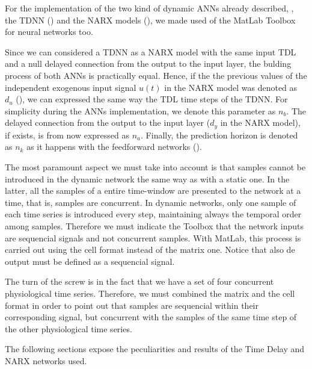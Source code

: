 
\label{sec:application:tdnn}

For the implementation of the two kind of dynamic ANNs already described, 
\ie, the TDNN () and the NARX models (), 
we made used of the MatLab Toolbox for neural networks too. 

Since we can considered a TDNN as a NARX model with the same input TDL 
and a null delayed connection from the output to the input layer, 
the bulding process of both ANNs is practically equal. Hence, if the the previous values of the independent exogenous input signal $u(t)$ in the NARX model was denoted as $d_{u}$ (), we can expressed the same way the TDL time steps of the TDNN. For simplicity during the ANNs implementation, we denote this parameter as $n_{b}$. The delayed connection from the output to the input layer ($d_{y}$ in the NARX model), if exists, is from now expressed as $n_{a}$. 
Finally, the prediction horizon is denoted as $n_{k}$ as it happens with the feedforward networks ().

The most paramount aspect we must take into account is that samples cannot be introduced in the dynamic network the same way as with a static one. 
In the latter, all the samples of a entire time-window are presented to the network at a time, that is, samples are concurrent. 
In dynamic networks, only one sample of each time series is introduced every step, maintaining always the temporal order among samples. Therefore we must indicate the Toolbox that the network inputs are sequencial signals and not concurrent samples. With MatLab, this process is carried out using the cell format instead of the matrix one. Notice that also de output must be defined as a sequencial signal.

The turn of the screw is in the fact that we have a set of four concurrent physiological time series. Therefore, we must combined the matrix and the cell format in order to point out that samples are sequencial within their corresponding signal, but concurrent with the samples of the same time step of the other physiological time series.

The following sections expose the peculiarities and results of the Time Delay and NARX networks used.



